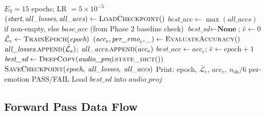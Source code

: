 \documentclass[12pt,a4paper]{article}
\theoremstyle{definition}
\theoremstyle{remark}
\begin{document}
\begin{algorithm}[H]
\caption{Phase 3: Full Training Loop}
\label{alg:phase3_full}
\begin{algorithmic}[1]
\Require $E_3 = 15$ epochs; LR $= 5\times10^{-5}$
\State $(\textit{start}, \textit{all\_losses}, \textit{all\_accs})
    \gets \textsc{LoadCheckpoint}()$
\State $\textit{best\_acc} \gets \max(\textit{all\_accs})$ if non-empty,
    else $\textit{base\_acc}$ (from Phase 2 baseline check)
\State $\textit{best\_sd} \gets \textbf{None}$; $\hat{e} \gets 0$
  \State $\bar{\mathcal{L}}_e \gets \textsc{TrainEpoch}(\textit{epoch})$
  \State $(\textit{acc}_e, \textit{per\_emo}_e, \_) \gets \textsc{EvaluateAccuracy}()$
  \State $\textit{all\_losses}.\textsc{append}(\bar{\mathcal{L}}_e)$;
         $\textit{all\_accs}.\textsc{append}(\textit{acc}_e)$
    \State $\textit{best\_acc} \gets \textit{acc}_e$; $\hat{e} \gets \textit{epoch} + 1$
    \State $\textit{best\_sd} \gets \textsc{DeepCopy}(\textit{audio\_proj}.\textsc{state\_dict}())$
  \EndIf
  \State $\textsc{SaveCheckpoint}(\textit{epoch},\;
    \textit{all\_losses},\; \textit{all\_accs})$ 
  \State Print: epoch, $\bar{\mathcal{L}}_e$, $\textit{acc}_e$, $n_{\text{ok}}/6$ per-emotion PASS/FAIL
\EndFor
\State Load $\textit{best\_sd}$ into $\textit{audio\_proj}$
\end{algorithmic}
\end{algorithm}

\subsection{Forward Pass Data Flow}
\end{document}
